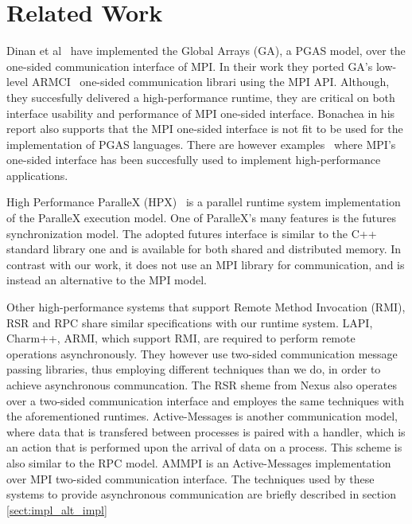 \section{Related Work}
Dinan et al~\cite{Dinan:2012:SGA:2357496.2358660}
have implemented the Global Arrays (GA)\cite{Nieplocha:2006:AAP:1125980.1125985}, a PGAS model, over the one-sided
communication interface of MPI.  In their work they ported GA's low-level ARMCI~\cite{Nieplocha99armci:a} one-sided
communication librari using the MPI API.  Although, they succesfully delivered a high-performance runtime, they 
are critical on both interface usability and performance of MPI one-sided interface.  Bonachea in his report
\cite{Bonachea:mpi2} also supports that the MPI one-sided interface is not fit to be used for the implementation 
of PGAS languages.  There are however examples~\cite{A_hydra-mpi:an, Cui:2010:SES:1884643.1884646}
where MPI's one-sided interface has been succesfully used to implement high-performance applications.  

High Performance ParalleX (HPX)~\cite{HPX:TOBE} is a parallel runtime system 
implementation of the ParalleX\cite{Kaiser:2009:PAP:1678991.1679815} 
execution model.  One of ParalleX's many features is the futures synchronization model.
The adopted futures interface is similar to the C++ standard library one and is available for both shared and distributed
memory.  In contrast with our work, it does not use an MPI library for communication, and is instead an alternative to
the MPI model.  

Other high-performance systems that support Remote Method Invocation (RMI), RSR and RPC share similar specifications
with our runtime system.  LAPI\cite{Shah:1998:PEL:876880.879642}, 
Charm++\cite{Kale93charm++:a}, 
ARMI\cite{Saunders:2003:AAP:966049.781534}, which support RMI, are required to perform remote operations 
asynchronously.  They however use two-sided communication message passing libraries, thus employing different 
techniques than we do, in order to achieve asynchronous communcation.  The RSR sheme from Nexus\cite{Foster96thenexus} 
also operates 
over a two-sided communication interface and employes the same techniques with the aforementioned runtimes.
Active-Messages is another communication model, where data that is transfered between processes is paired with 
a handler, which is an action that is performed upon the arrival of data on a process.  This scheme is also similar
to the RPC model.  AMMPI\cite{Bonachea:ammpi} is an Active-Messages implementation over MPI two-sided communication
interface.  The techniques used by these systems to provide asynchronous communication are briefly described in
section \ref{sect:impl_alt_impl}

